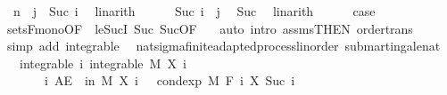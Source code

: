 \begin{isabellebody}
\ {\isacharasterisk}{\kern0pt}{\isacharcolon}{\kern0pt}\ {\isachardoublequoteopen}n\ {\isacharequal}{\kern0pt}\ j\ {\isacharminus}{\kern0pt}\ Suc\ i{\isachardoublequoteclose}\ \isamarkupfalse%
\ linarith\isanewline
\ \ \ \ \isamarkupfalse%
\ {\isachardoublequoteopen}Suc\ i\ {\isasymle}\ j{\isachardoublequoteclose}\ \isamarkupfalse%
\ Suc{\isacharparenleft}{\kern0pt}{}{\isacharcomma}{\kern0pt}{}{\isacharparenright}{\kern0pt}\ \isamarkupfalse%
\ linarith\isanewline
\ \ \ \ \isamarkupfalse%
\ {\isacharquery}{\kern0pt}case\ \isamarkupfalse%
\ sets{\isacharunderscore}{\kern0pt}F{\isacharunderscore}{\kern0pt}mono{\isacharbrackleft}{\kern0pt}OF\ {\isacharunderscore}{\kern0pt}\ le{\isacharunderscore}{\kern0pt}SucI{\isacharbrackright}{\kern0pt}\ Suc{\isacharparenleft}{\kern0pt}{}{\isacharparenright}{\kern0pt}\ Suc{\isacharparenleft}{\kern0pt}{}{\isacharparenright}{\kern0pt}{\isacharbrackleft}{\kern0pt}OF\ {\isacharasterisk}{\kern0pt}{\isacharbrackright}{\kern0pt}\ \isamarkupfalse%
\ {\isacharparenleft}{\kern0pt}auto\ intro{\isacharcolon}{\kern0pt}\ assms{\isacharparenleft}{\kern0pt}{}{\isacharparenright}{\kern0pt}{\isacharbrackleft}{\kern0pt}THEN\ order{\isacharunderscore}{\kern0pt}trans{\isacharbrackright}{\kern0pt}{\isacharparenright}{\kern0pt}\isanewline
\ \ \isamarkupfalse%
\isanewline
{}\isamarkupfalse%
\ {\isacharparenleft}{\kern0pt}simp\ add{\isacharcolon}{\kern0pt}\ integrable{\isacharparenright}{\kern0pt}%
\endisatagproof
{\isafoldproof}%
%
\isadelimproof
\isanewline
%
\endisadelimproof
\isanewline
{}\isamarkupfalse%
\ {\isacharparenleft}{\kern0pt}\ nat{\isacharunderscore}{\kern0pt}sigma{\isacharunderscore}{\kern0pt}finite{\isacharunderscore}{\kern0pt}adapted{\isacharunderscore}{\kern0pt}process{\isacharunderscore}{\kern0pt}linorder{\isacharparenright}{\kern0pt}\ submartingale{\isacharunderscore}{\kern0pt}nat{\isacharcolon}{\kern0pt}\isanewline
\ \ \ integrable{\isacharcolon}{\kern0pt}\ {\isachardoublequoteopen}{\isasymAnd}i{\isachardot}{\kern0pt}\ integrable\ M\ {\isacharparenleft}{\kern0pt}X\ i{\isacharparenright}{\kern0pt}{\isachardoublequoteclose}\ \isanewline
\ \ \ \ \ \ \ {\isachardoublequoteopen}{\isasymAnd}i{\isachardot}{\kern0pt}\ AE\ {\isasymxi}\ in\ M{\isachardot}{\kern0pt}\ X\ i\ {\isasymxi}\ {\isasymle}\ cond{\isacharunderscore}{\kern0pt}exp\ M\ {\isacharparenleft}{\kern0pt}F\ i{\isacharparenright}{\kern0pt}\ {\isacharparenleft}{\kern0pt}X\ {\isacharparenleft}{\kern0pt}Suc\ i{\isacharparenright}{\kern0pt}{\isacharparenright}{\kern0pt}\ {\isasymxi}{\isachardoublequoteclose}\ \isanewline

\end{isabellebody}
